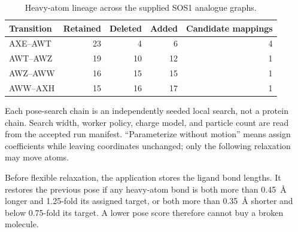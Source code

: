 \begin{table}[htbp]
  \centering
  \caption{Heavy-atom lineage across the supplied SOS1 analogue graphs.}
  \label{tab:sos1-graph-edits}
  \footnotesize
  \begin{tabular}{@{}lrrrr@{}}
    \toprule
    Transition & Retained & Deleted & Added & Candidate mappings \\
    \midrule
    AXE--AWT & 23 & 4 & 6 & 4 \\
    AWT--AWZ & 19 & 10 & 12 & 1 \\
    AWZ--AWW & 16 & 15 & 15 & 1 \\
    AWW--AXH & 15 & 16 & 17 & 1 \\
    \bottomrule
  \end{tabular}
\end{table}

Each pose-search chain is an independently seeded local search, not a protein
chain. Search width, worker policy, charge model, and particle count are read
from the accepted run manifest. ``Parameterize without motion'' means assign
coefficients while leaving coordinates unchanged; only the following relaxation
may move atoms.

Before flexible relaxation, the application stores the ligand bond lengths. It
restores the previous pose if any heavy-atom bond is both more than 0.45~\AA{}
longer and 1.25-fold its assigned target, or both more than 0.35~\AA{} shorter
and below 0.75-fold its target. A lower pose score therefore cannot buy a broken
molecule.

